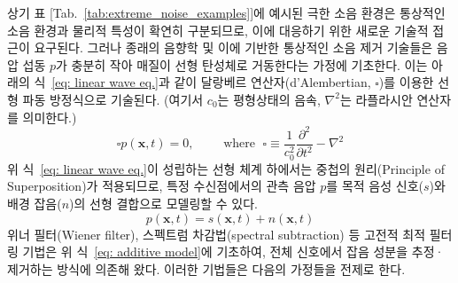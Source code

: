 \documentclass{article}
\begin{document}
상기 표 [Tab.~\ref{tab:extreme_noise_examples}]에 예시된 극한 소음 환경은 통상적인 소음 환경과 물리적 특성이 확연히 구분되므로, 이에 대응하기 위한 새로운 기술적 접근이 요구된다. 
그러나 종래의 음향학 및 이에 기반한 통상적인 소음 제거 기술들은 음압 섭동 $p$가 충분히 작아 매질이 선형 탄성체로 거동한다는 가정에 기초한다. 
이는 아래의 식~\eqref{eq: linear wave eq.}과 같이 달랑베르 연산자(d'Alembertian, $\square$)를 이용한 선형 파동 방정식으로 기술된다.
(여기서 $c_{0}$는 평형상태의 음속, $\nabla^2$는 라플라시안 연산자를 의미한다.)
\begin{equation}\label{eq: linear wave eq.}
    \square p (\mathbf{x}, t) = 0, \qquad 
    \text{ where } \;
    \square \equiv \frac{1}{c_0^2}\frac{\partial^2}{\partial t^2} - \nabla^{2}
\end{equation}
위 식~\eqref{eq: linear wave eq.}이 성립하는 선형 체계 하에서는 중첩의 원리(Principle of Superposition)가 적용되므로, 특정 수신점에서의 관측 음압 $p$를 목적 음성 신호($s$)와 배경 잡음($n$)의 선형 결합으로 모델링할 수 있다.
\begin{equation}\label{eq: additive model}
    p (\mathbf{x}, t) = s(\mathbf{x}, t) + n (\mathbf{x}, t)
\end{equation}
위너 필터(Wiener filter), 스펙트럼 차감법(spectral subtraction) 등 고전적 최적 필터링 기법은 위 식~\eqref{eq: additive model}에 기초하여, 전체 신호에서 잡음 성분을 추정·제거하는 방식에 의존해 왔다. 이러한 기법들은 다음의 가정들을 전제로 한다.
\end{document}
